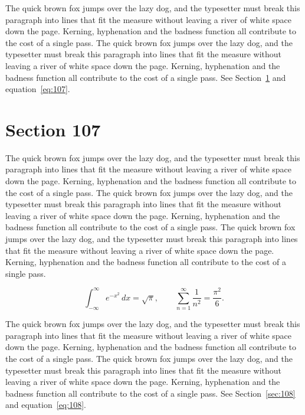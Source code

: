 \documentclass{article}
\begin{document}
The quick brown fox jumps over the lazy dog, and the typesetter must break this paragraph into lines that fit the measure without leaving a river of white space down the page. Kerning, hyphenation and the badness function all contribute to the cost of a single pass. The quick brown fox jumps over the lazy dog, and the typesetter must break this paragraph into lines that fit the measure without leaving a river of white space down the page. Kerning, hyphenation and the badness function all contribute to the cost of a single pass. 
See Section~\ref{sec:107} and equation~\eqref{eq:107}.
\section{Section 107}
\label{sec:107}
The quick brown fox jumps over the lazy dog, and the typesetter must break this paragraph into lines that fit the measure without leaving a river of white space down the page. Kerning, hyphenation and the badness function all contribute to the cost of a single pass. The quick brown fox jumps over the lazy dog, and the typesetter must break this paragraph into lines that fit the measure without leaving a river of white space down the page. Kerning, hyphenation and the badness function all contribute to the cost of a single pass. The quick brown fox jumps over the lazy dog, and the typesetter must break this paragraph into lines that fit the measure without leaving a river of white space down the page. Kerning, hyphenation and the badness function all contribute to the cost of a single pass. 

\begin{equation}\label{eq:107}
\int_{-\infty}^{\infty} e^{-x^{2}}\,dx = \sqrt{\pi}, \qquad
\sum_{n=1}^{\infty} \frac{1}{n^{2}} = \frac{\pi^{2}}{6}.
\end{equation}

The quick brown fox jumps over the lazy dog, and the typesetter must break this paragraph into lines that fit the measure without leaving a river of white space down the page. Kerning, hyphenation and the badness function all contribute to the cost of a single pass. The quick brown fox jumps over the lazy dog, and the typesetter must break this paragraph into lines that fit the measure without leaving a river of white space down the page. Kerning, hyphenation and the badness function all contribute to the cost of a single pass. 
See Section~\ref{sec:108} and equation~\eqref{eq:108}.
\end{document}
